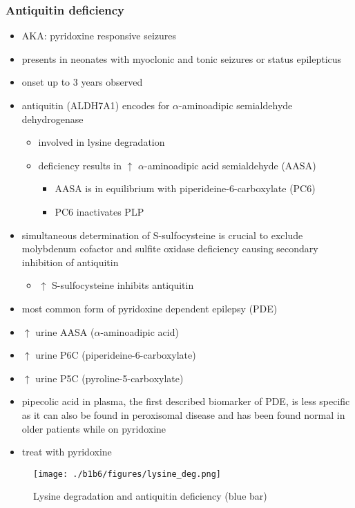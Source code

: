 \documentclass{scrartcl}
\begin{document}
\subsubsection{Antiquitin deficiency}
\label{sec:orgc0b2a1d}
\begin{itemize}
\item AKA: pyridoxine responsive seizures
\item presents in neonates with myoclonic and tonic seizures or
status epilepticus
\item onset up to 3 years observed
\item antiquitin (ALDH7A1) encodes for \(\alpha\)-aminoadipic semialdehyde dehydrogenase
\begin{itemize}
\item involved in lysine degradation
\item deficiency results in \(\uparrow\) \(\alpha\)-aminoadipic acid semialdehyde (AASA)
\begin{itemize}
\item AASA is in equilibrium with piperideine-6-carboxylate (PC6)
\item PC6 inactivates PLP
\end{itemize}
\end{itemize}
\item simultaneous determination of S-sulfocysteine is crucial to exclude
molybdenum cofactor and sulfite oxidase deficiency causing secondary
inhibition of antiquitin
\begin{itemize}
\item \(\uparrow\) S-sulfocysteine inhibits antiquitin
\end{itemize}
\item most common form of pyridoxine dependent epilepsy (PDE)
\item \(\uparrow\) urine AASA (\(\alpha\)-aminoadipic acid)
\item \(\uparrow\) urine P6C (piperideine-6-carboxylate)
\item \(\uparrow\) urine P5C (pyroline-5-carboxylate)
\item pipecolic acid in plasma, the first described biomarker of PDE, is
less specific as it can also be found in peroxisomal disease and has
been found normal in older patients while on pyridoxine
\item treat with pyridoxine
\end{itemize}

\begin{figure}[htbp]
\centering
\texttt{[image: ./b1b6/figures/lysine\_deg.png]}
\caption{\label{fig:org94aced3}
Lysine degradation and antiquitin deficiency (blue bar)}
\end{figure}
\end{document}
